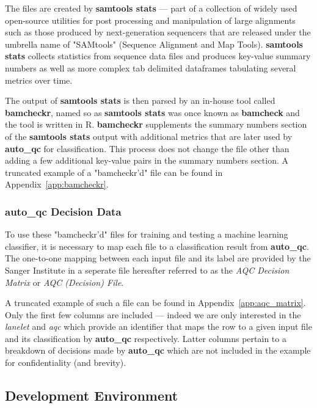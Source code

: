 
The files are created by \textbf{samtools stats} --- part of a collection of
widely used open-source utilities for post processing and manipulation of large
alignments such as those produced by next-generation sequencers that are
released under the umbrella name of "SAMtools"\citep{samtools} (Sequence Alignment and Map
Tools). \textbf{samtools stats} collects statistics from sequence data files %
and produces key-value summary numbers as well as more complex tab delimited
dataframes tabulating several metrics over time.

The output of \textbf{samtools stats} is then parsed by an in-house tool called
\textbf{bamcheckr}, named so as \textbf{samtools stats} was once known as
\textbf{bamcheck} and the tool is written in R. \textbf{bamcheckr} supplements
the summary numbers section of the \textbf{samtools stats} output with
additional metrics that are later used by \textbf{auto\_qc} for classification.
This process does not change the file other than adding a few additional
key-value pairs in the summary numbers section. A truncated example of a
"bamcheckr'd" file can be found in Appendix~\ref{app:bamcheckr}.

\subsubsection{auto\_qc Decision Data}
To use these "bamcheckr'd" files for training and testing a machine learning
classifier, it is necessary to map each file to a classification result from
\textbf{auto\_qc}. The one-to-one mapping between each input file and its label
are provided by the Sanger Institute in a seperate file hereafter referred to as
the \textit{AQC Decision Matrix} or \textit{AQC (Decision) File}.

A truncated example of such a file can be found in Appendix~\ref{app:aqc_matrix}.
Only the first few columns are included --- indeed we are only interested in the
\textit{lanelet} and \textit{aqc} which provide an identifier that maps the row
to a given input file and its classification by \textbf{auto\_qc} respectively.
Latter columns pertain to a breakdown of decisions made by \textbf{auto\_qc}
which are not included in the example for confidentiality (and brevity).


\subsection{Development Environment}
